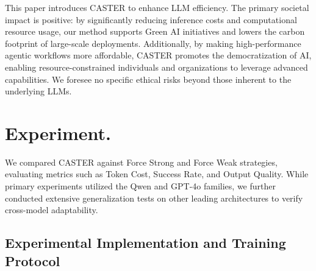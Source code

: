 \documentclass{article}
\theoremstyle{plain}
\theoremstyle{definition}
\theoremstyle{remark}
\begin{document}
This paper introduces CASTER to enhance LLM efficiency. The primary societal impact is positive: by significantly reducing inference costs and computational resource usage, our method supports Green AI initiatives and lowers the carbon footprint of large-scale deployments. Additionally, by making high-performance agentic workflows more affordable, CASTER promotes the democratization of AI, enabling resource-constrained individuals and organizations to leverage advanced capabilities. We foresee no specific ethical risks beyond those inherent to the underlying LLMs.





\newpage
\appendix
\onecolumn

\section{Experiment.}
\label{app:exp}


We compared CASTER against Force Strong and Force Weak strategies, evaluating metrics such as Token Cost, Success Rate, and Output Quality. While primary experiments utilized the Qwen and GPT-4o families, we further conducted extensive generalization tests on other leading architectures to verify cross-model adaptability.

\subsection{Experimental Implementation and Training Protocol}
\end{document}
